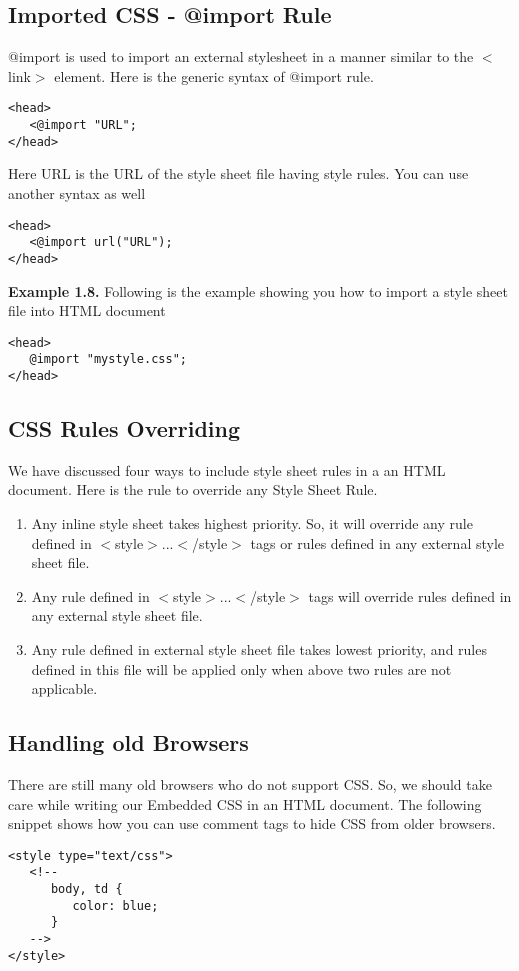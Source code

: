 \documentclass[a4paper,oneside]{book}
\numberwithin{equation}{chapter}
\begin{document}
\subsection{Imported CSS - @import Rule}
@import is used to import an external stylesheet in a manner similar to the $<$link$>$ element. Here is the generic syntax of @import rule.
\begin{verbatim}
<head>
   <@import "URL";
</head>
\end{verbatim}
Here URL is the URL of the style sheet file having style rules. You can use another syntax as well
\begin{verbatim}
<head>
   <@import url("URL");
</head>
\end{verbatim}
\textbf{Example 1.8.} Following is the example showing you how to import a style sheet file into HTML document
\begin{verbatim}
<head>
   @import "mystyle.css";
</head>
\end{verbatim}
\subsection{CSS Rules Overriding}
We have discussed four ways to include style sheet rules in a an HTML document. Here is the rule to override any Style Sheet Rule.
\begin{enumerate}
\item Any inline style sheet takes highest priority. So, it will override any rule defined in $<$style$>$...$<$/style$>$ tags or rules defined in any external style sheet file.
\item Any rule defined in $<$style$>$...$<$/style$>$ tags will override rules defined in any external style sheet file.
\item Any rule defined in external style sheet file takes lowest priority, and rules defined in this file will be applied only when above two rules are not applicable.
\end{enumerate}
\subsection{Handling old Browsers}
There are still many old browsers who do not support CSS. So, we should take care while writing our Embedded CSS in an HTML document. The following snippet shows how you can use comment tags to hide CSS from older browsers.
\begin{verbatim}
<style type="text/css">
   <!--
      body, td {
         color: blue;
      }
   -->
</style>
\end{verbatim}
\end{document}
